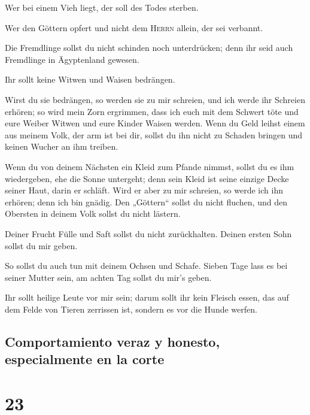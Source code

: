  Wer bei einem Vieh liegt, der soll des Todes sterben.

 Wer den Göttern opfert und nicht dem \textsc{Herrn}
allein, der sei verbannt.

 Die Fremdlinge sollst du nicht schinden noch
unterdrücken; denn ihr seid auch Fremdlinge in Ägyptenland gewesen.

 Ihr sollt keine Witwen und Waisen bedrängen.

 Wirst du sie bedrängen, so werden sie zu mir schreien,
und ich werde ihr Schreien erhören;  so wird mein Zorn
ergrimmen, dass ich euch mit dem Schwert töte und eure Weiber Witwen und
eure Kinder Waisen werden.  Wenn du Geld leihst einem aus
meinem Volk, der arm ist bei dir, sollst du ihn nicht zu Schaden bringen
und keinen Wucher an ihm treiben.

 Wenn du von deinem Nächsten ein Kleid zum Pfande nimmst,
sollst du es ihm wiedergeben, ehe die Sonne untergeht; 
denn sein Kleid ist seine einzige Decke seiner Haut, darin er schläft.
Wird er aber zu mir schreien, so werde ich ihn erhören; denn ich bin
gnädig.  Den „Göttern`` sollst du nicht fluchen, und den
Obersten in deinem Volk sollst du nicht lästern.

 Deiner Frucht Fülle und Saft sollst du nicht
zurückhalten. Deinen ersten Sohn sollst du mir geben.

 So sollst du auch tun mit deinem Ochsen und Schafe.
Sieben Tage lass es bei seiner Mutter sein, am achten Tag sollst du
mir's geben.

 Ihr sollt heilige Leute vor mir sein; darum sollt ihr
kein Fleisch essen, das auf dem Felde von Tieren zerrissen ist, sondern
es vor die Hunde werfen.

\hypertarget{comportamiento-veraz-y-honesto-especialmente-en-la-corte}{%
\subsection{Comportamiento veraz y honesto, especialmente en la
corte}\label{comportamiento-veraz-y-honesto-especialmente-en-la-corte}}

\hypertarget{section-22}{%
\section{23}\label{section-22}}


